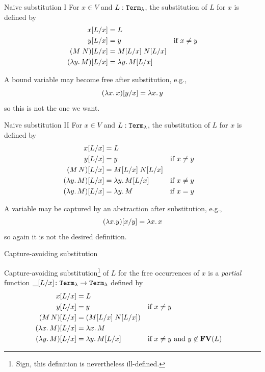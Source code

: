 \begin{frame}{Naive substitution I}
    For $x \in V$ and $L : \mathtt{Term}_\lambda$, the substitution of $L$ for $x$ is
    defined by
    \begin{align*}
      x[{L}/{x}] & = L \\
      y[{L}/{x}] & = y & \text{if $x \neq y$} \\
      (M\;N)[{L}/{x}]& = M[{L}/{x}] \; N[{L}/{x}] \\
      (\lambda y.\, M)[{L}/{x}] & = \lambda y.\, M [{L}/{x}]
    \end{align*}

    A bound variable may become free after substitution, e.g.,\  
    \[
      (\lambda x.\, x)[{y}/{x}] = \lambda x.\, y
    \]
    so this is not the one we want.
\end{frame}
\begin{frame}{Naive substitution II}
    For $x \in V$ and $L : \mathtt{Term}_\lambda$, the substitution
    of $L$ for $x$ is defined by
    \begin{align*}
      x[{L}/{x}] & = L \\
      y[{L}/{x}] & = y && \text{if $x \neq y$} \\
      (M\,N)[{L}/{x}] & = M[{L}/{x}]\; N[{L}/{x}] \\
      (\lambda y.\, M)[{L}/{x}] & = \lambda y.\, M[{L}/{x}] && \text{if $x \neq y$} \\
      (\lambda y.\, M)[{L}/{x}] & = \lambda y.\, M && \text{if $x = y$} 
    \end{align*}

    A variable may be captured by an abstraction after substitution, e.g.,
    \[
      (\lambda x. y)[{x}/{y}] = \lambda x.\, x
    \]
    so again it is not the desired definition.
\end{frame}


\begin{frame}{Capture-avoiding substitution}
  \begin{definition}
    Capture-avoiding substitution\footnote{Sign, this definition is nevertheless ill-defined.} of $L$ for the \alert{free occurrences} of $x$ is a
    \emph{partial} function $\_[{L}/{x}]\colon \mathtt{Term}_\lambda \to \mathtt{Term}_\lambda$ defined by
    \begin{align*}
      x[{L}/{x}] & = L \\
      y[{L}/{x}] & = y && \text{if $x \neq y$} \\
      (M\, N)[{L}/{x}] & = (M[{L}/{x}]\; N[{L}/{x}]) \\
      (\lambda x.\, M)[{L}/{x}] & = \lambda x.\, M \\
      (\lambda y.\, M)[{L}/{x}] & = \lambda y.\, M[{L}/{x}]                                 &&\text{if $x \neq y$ and $y \not\in \mathbf{FV}(L)$}
    \end{align*}
  \end{definition}

\end{frame}

